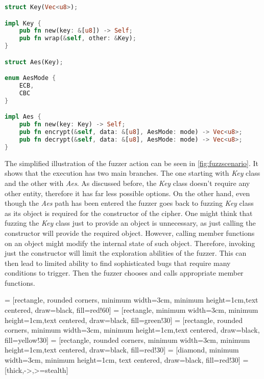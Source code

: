 \begin{minipage}{\linewidth}
\begin{lstlisting}[language=rust,caption={Target API exmaple},label={lst:extarget}]
struct Key(Vec<u8>);

impl Key {
    pub fn new(key: &[u8]) -> Self;
    pub fn wrap(&self, other: &Key);
}

struct Aes(Key);

enum AesMode {
    ECB,
    CBC
}

impl Aes {
    pub fn new(key: Key) -> Self;
    pub fn encrypt(&self, data: &[u8], AesMode: mode) -> Vec<u8>;
    pub fn decrypt(&self, data: &[u8], AesMode: mode) -> Vec<u8>;
}
\end{lstlisting}
\end{minipage}

The simplified illustration of the fuzzer action can be seen in \ref{fig:fuzzscenario}. It shows that the execution has two main branches. The one starting with \textit{Key} class and the other with \textit{Aes}. As discussed before, the \textit{Key} class doesn't require any other entity, therefore it has far less possible options. On the other hand, even though the \textit{Aes} path has been entered the fuzzer goes back to fuzzing \textit{Key} class as its object is required for the constructor of the cipher. One might think that fuzzing the \textit{Key} class just to provide an object is unnecessary, as just calling the constructor will provide the required object. However, calling member functions on an object might modify the internal state of such object. Therefore, invoking just the constructor will limit the exploration abilities of the fuzzer. This can then lead to limited ability to find sophisticated bugs that require many conditions to trigger. Then the fuzzer chooses and calls appropriate member functions.

 = [rectangle, rounded corners, minimum width=3cm, minimum height=1cm,text centered, draw=black, fill=red!60]
 = [rectangle, minimum width=3cm, minimum height=1cm,text centered, draw=black, fill=green!30]
 = [rectangle, rounded corners, minimum width=3cm, minimum height=1cm,text centered, draw=black, fill=yellow!30]
 = [rectangle, rounded corners, minimum width=3cm, minimum height=1cm,text centered, draw=black, fill=red!30]
 = [diamond, minimum width=3cm, minimum height=1cm, text centered, draw=black, fill=red!30]
 = [thick,->,>=stealth]

